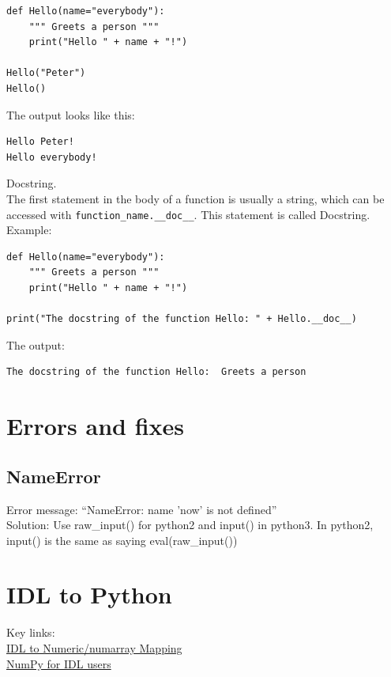 \documentclass[11pt,a4paper]{article}
\begin{document}
\begin{lstlisting}
def Hello(name="everybody"):
    """ Greets a person """
    print("Hello " + name + "!")

Hello("Peter")
Hello()
\end{lstlisting}

\noindent
The output looks like this:

\begin{lstlisting}
Hello Peter!
Hello everybody!
\end{lstlisting}

\noindent
Docstring.\\
The first statement in the body of a function is usually a string, which can be accessed with {\tt function\_name.\_\_doc\_\_}. This statement is called Docstring. Example:

\begin{lstlisting}
def Hello(name="everybody"):
    """ Greets a person """
    print("Hello " + name + "!")

print("The docstring of the function Hello: " + Hello.__doc__)
\end{lstlisting}

\noindent 
The output:
\begin{lstlisting}
The docstring of the function Hello:  Greets a person 
\end{lstlisting}







\newpage
\section{Errors and fixes}
    \subsection{NameError}
    Error message: ``NameError: name 'now' is not defined''\\
    Solution: Use raw\_input() for python2 and input() in python3. In python2, input() is the same as saying eval(raw\_input()) \\ 







\newpage
\section{IDL to Python}
Key links:\\
\href{http://www.johnny-lin.com/cdat_tips/tips_array/idl2num.html}{IDL to Numeric/numarray Mapping}\\
\href{http://www.astro.umd.edu/~mbk/idl-numpy.html}{NumPy for IDL users}\\
\end{document}
